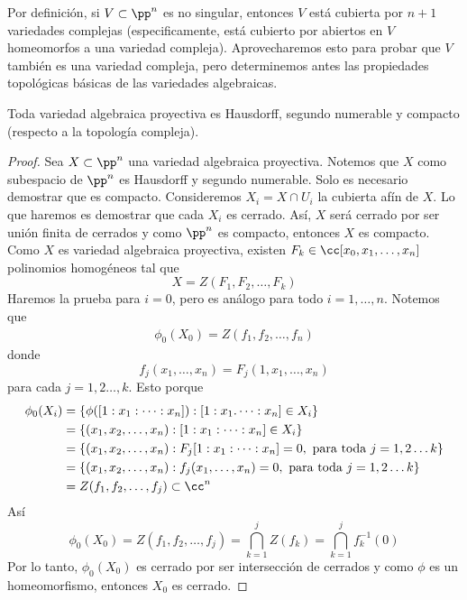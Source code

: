     Por definición, si $V\subset\pp^n$ es no singular, entonces $V$ está cubierta por $n+1$ variedades complejas (especificamente, está cubierto por abiertos en $V$ homeomorfos a una variedad compleja). Aprovecharemos esto para probar que $V$ también es una variedad compleja, pero determinemos antes las propiedades topológicas básicas de las variedades algebraicas.
    
    \begin{lemma}\label{topovariedades}
    	Toda variedad algebraica proyectiva es Hausdorff, segundo numerable y compacto (respecto a la topología compleja).
    \end{lemma}
    
    \begin{proof}
    	Sea $X\subset \pp^n$ una variedad algebraica proyectiva. Notemos que $X$ como subespacio de $\pp^n$ es Hausdorff y segundo numerable. Solo es necesario demostrar que es compacto. Consideremos $X_i=X\cap U_i$ la cubierta afín de $X$. Lo que haremos es demostrar que cada $X_i$ es cerrado. Así, $X$ será cerrado por ser unión finita de cerrados y como $\pp^n$ es compacto, entonces $X$ es compacto.\\
    	Como $X$ es variedad algebraica proyectiva, existen $F_k\in\cc[x_0,x_1,\dots,x_n]$ polinomios homogéneos tal que
    	\begin{equation*}
    		X=Z(F_1,F_2,\dots, F_k)        
    	\end{equation*}
    	Haremos la prueba para $i=0$, pero es análogo para todo $i=1,\dots, n$.
    	Notemos que
    	\begin{align*}
    		\phi_0(X_0)=Z(f_1,f_2,\dots, f_n)
    	\end{align*}
    	donde 
    	\begin{equation*}
    		f_j(x_1,\dots,x_n)=F_j\left(1,x_1,\dots,x_n\right)
    	\end{equation*}
    	para cada $j=1,2\dots,k$. Esto porque
    	\begin{align*}
    		\phi_0(X_i)&=\{\phi([1:x_1:\dots:x_n]):[1:x_1.\dots:x_n]\in X_i\}\\
    		&=\{(x_1,x_2,\dots,x_n):[1:x_1:\dots:x_n]\in X_i\}\\
    		&=\{(x_1,x_2,\dots,x_n):F_j[1:x_1:\dots:x_n]=0, \text{ para toda } j=1,2\dots k\}\\
    		&=\{(x_1,x_2,\dots,x_n):f_j(x_1,\dots,x_n)=0, \text{ para toda } j=1,2\dots k\}\\
    		&=Z(f_1,f_2,\dots,f_j)\subset \cc^n
    	\end{align*}
    	Así
    	\begin{equation*}
    		\phi_0(X_0)=Z(f_1,f_2,\dots,f_j)=\bigcap_{k=1}^jZ(f_k)=\bigcap_{k=1}^jf_k^{-1}(0)
    	\end{equation*}
    	Por lo tanto, $\phi_0(X_0)$ es cerrado por ser intersección de cerrados y como $\phi$ es un homeomorfismo, entonces $X_0$ es cerrado.
    \end{proof}
    
